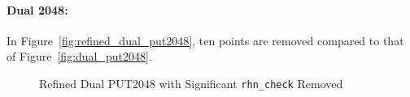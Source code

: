 \documentclass[10pt]{article}
\begin{document}
\clearpage
\newpage

\paragraph{Dual 2048:} In Figure~\ref{fig:refined_dual_put2048}, ten points are removed compared to that of Figure~\ref{fig:dual_put2048}.

\begin{figure}[h]
	\centering
	\caption{Refined Dual PUT2048 with Significant {\tt rhn\_check} Removed~\label{fig:new_put2048}}
\end{figure}
\end{document}
